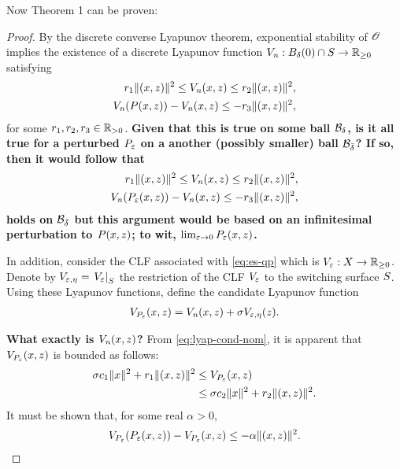 \documentclass[twocolumn]{article}
\begin{document}
Now Theorem 1 can be proven:
\begin{proof}
  By the discrete converse Lyapunov theorem, exponential stability of $\Orbit$ implies the existence of a discrete Lyapunov function $\Vn : B_{\delta}(0) \cap \S \to \Rnn$ satisfying
  \begin{align}
    \nonumber
    r_{1} \| (\zdx, \zdz) \|^{2} \leq \Vn(\zdx, \zdz) \leq r_{2} \| (\zdx, \zdz) \|^2,\\
    \Vn(\P(\zdx, \zdz)) - \Vn(\zdx, \zdz) \leq -r_{3} \| (\zdx, \zdz) \|^{2},
    \label{eq:lyap-cond-nom}
  \end{align}
  for some $r_{1}, r_{2}, r_{3} \in \Rpd$.
  {\bf Given that this is true on some ball $\B_{\delta}$, is it all true for a perturbed $\Pe$ on a another (possibly smaller) ball $\B_{\bar \delta}$? If so, then it would follow that
    \begin{align}
      \nonumber
      r_{1} \| (\zdx, \zdz) \|^{2} \leq \Vn(\zdx, \zdz) \leq r_{2} \| (\zdx, \zdz) \|^2,\\
      \Vn(\P_{\resclfparam}(\zdx, \zdz)) - \Vn(\zdx, \zdz) \leq -r_{3} \| (\zdx, \zdz) \|^{2},
      \label{eq:lyap-cond-pert}
    \end{align}
    holds on $\B_{\bar \delta}$ but this argument would be based on an infinitesimal perturbation to $P(\zdx, \zdz)$; to wit, $\limeps \Pe(\zdx, \zdz)$.}

  In addition, consider the CLF associated with \eqref{eq:es-qp} which is $\Ve : \zdX \to \Rnn$.
  Denote by $\Vee = \VeS$ the restriction of the CLF $\Ve$ to the switching surface $\S$.
  Using these Lyapunov functions, define the candidate Lyapunov function
  \begin{align}
    \VP(\zdx, \zdz) = \Vn(\zdx, \zdz) + \sigma \Vee(\zdz).
  \end{align}

  {\bf What exactly is $\Vn(\zdx, \zdz)$?}
  From \eqref{eq:lyap-cond-nom}, it is apparent that $\VP(\zdx, \zdz)$ is bounded as follows:
  \begin{align}
    \sigma c_{1} \| \zdx \|^{2} + r_{1} \| (\zdx, \zdz) \|^{2} &\leq \VP(\zdx, \zdz)\\
    \nonumber
    &\leq \sigma c_{2} \| \zdx \|^{2} + r_{2} \| (\zdx, \zdz) \|^{2}.
  \end{align}
  It must be shown that, for some real $\alpha > 0$,
  \begin{align}
    \VP(\Pe(\zdx, \zdz)) - \VP(\zdx, \zdz) \leq -\alpha \| (\zdx, \zdz) \|^{2}.
  \end{align}
  

\end{proof}
\end{document}
